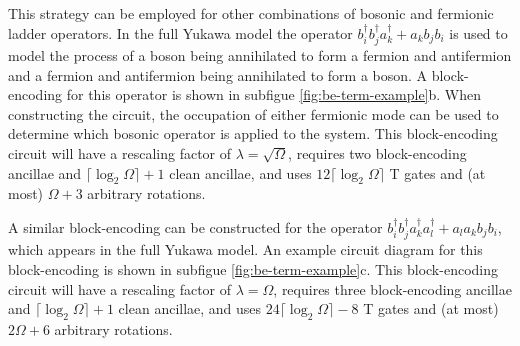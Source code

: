 This strategy can be employed for other combinations of bosonic and fermionic ladder operators.
In the full Yukawa model the operator $b_i^\dagger b_j^\dagger a_k^\dagger + a_k b_j b_i$ is used to model the process of a boson being annihilated to form a fermion and antifermion and a fermion and antifermion being annihilated to form a boson.
A block-encoding for this operator is shown in subfigue \ref{fig:be-term-example}b.
When constructing the circuit, the occupation of either fermionic mode can be used to determine which bosonic operator is applied to the system.
This block-encoding circuit will have a rescaling factor of $\lambda = \sqrt{\Omega}$, requires two block-encoding ancillae and $\lceil \log_2\Omega \rceil + 1$ clean ancillae, and uses  $12 \lceil \log_2 \Omega \rceil$ T gates and (at most) $\Omega + 3$ arbitrary rotations.

A similar block-encoding can be constructed for the operator $b_i^\dagger b_j^\dagger a_k^\dagger a_l^\dagger + a_l a_k b_j b_i$, which appears in the full Yukawa model.
An example circuit diagram for this block-encoding is shown in subfigue \ref{fig:be-term-example}c.
This block-encoding circuit will have a rescaling factor of $\lambda = \Omega$, requires three block-encoding ancillae and $\lceil \log_2\Omega \rceil + 1$ clean ancillae, and uses  $24 \lceil \log_2\Omega \rceil - 8$ T gates and (at most) $2\Omega + 6$ arbitrary rotations.

